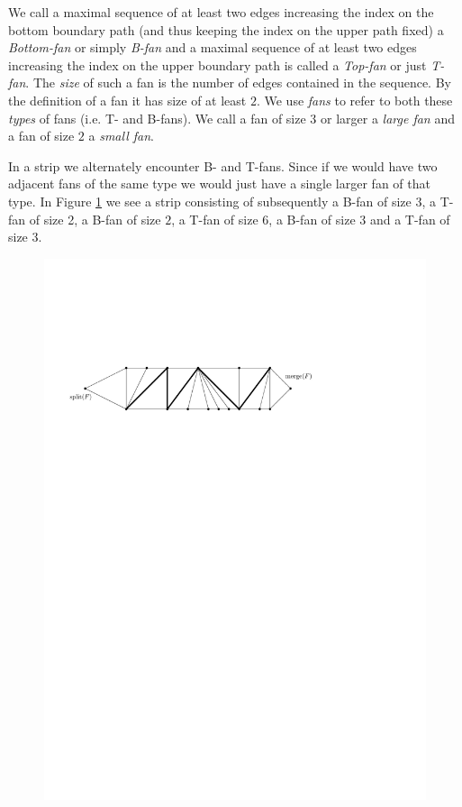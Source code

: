     We call a maximal sequence of at least two edges increasing the index on the bottom boundary path (and thus keeping the index on the upper path fixed) a \emph{Bottom-fan} or simply \emph{B-fan} and a maximal sequence of at least two edges increasing the index on the upper boundary path is called a \emph{Top-fan} or just \emph{T-fan}. The \emph{size} of such a fan is the number of edges contained in the sequence. By the definition of a fan it has size of at least $2$.
    We use \emph{fans} to refer to both these \emph{types} of fans (i.e. T- and B-fans).
    We call a fan of size $3$ or larger a \emph{large fan} and a fan of size $2$ a \emph{small fan}.

    In a strip we alternately encounter B- and T-fans. Since if we would have two adjacent fans of the same type we would just have a single larger fan of that type.
    In Figure \ref{fig:uni:fans} we see a strip consisting of subsequently a B-fan of size $3$, a T-fan of size 2, a B-fan of size $2$, a T-fan of size $6$, a B-fan of size $3$ and a T-fan of size $3$.

    \begin{figure}[h]
      \centering
      \includegraphics[scale=.9]{rectangularDuals/img/fans}
      \caption{}
      \label{fig:uni:fans}
    \end{figure}


